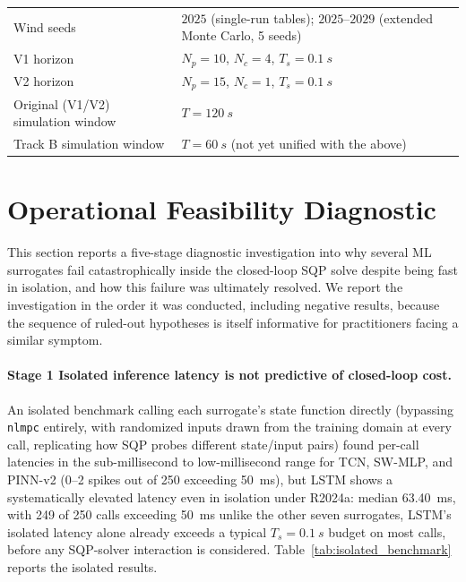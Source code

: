 \begin{table}[H]
\begin{tabularx}{\textwidth}{
			>{\raggedright\arraybackslash}p{4cm}
			>{\raggedright\arraybackslash}X
		}
		Wind seeds
		& $2025$ (single-run tables); $2025$--$2029$ (extended Monte Carlo,
		5 seeds) \\
		
		V1 horizon
		& $N_p=10$, $N_c=4$, $T_s=\SI{0.1}{s}$ \\
		
		V2 horizon
		& $N_p=15$, $N_c=1$, $T_s=\SI{0.1}{s}$ \\
		
		Original (V1/V2) simulation window
		& $T=\SI{120}{s}$ \\
		
		Track B simulation window
		& $T=\SI{60}{s}$ (not yet unified with the above) \\
		
		\bottomrule
	\end{tabularx}
\end{table}

\section{Operational Feasibility Diagnostic}
\label{subsec:operational_feasibility}

This section reports a five-stage diagnostic investigation into why
several ML surrogates fail catastrophically inside the closed-loop SQP
solve despite being fast in isolation, and how this failure was
ultimately resolved. We report the investigation in the order it was
conducted, including negative results, because the sequence of ruled-out
hypotheses is itself informative for practitioners facing a similar
symptom.

\paragraph{Stage 1  Isolated inference latency is not predictive of
closed-loop cost.} An isolated benchmark calling each surrogate's state
function directly (bypassing \texttt{nlmpc} entirely, with randomized
inputs drawn from the training domain at every call, replicating how
SQP probes different state/input pairs) found per-call latencies in the
sub-millisecond to low-millisecond range for TCN, SW-MLP, and PINN-v2
(0--2 spikes out of 250 exceeding \SI{50}{ms}), but LSTM shows a
systematically elevated latency even in isolation under R2024a: median
\SI{63.40}{ms}, with 249 of 250 calls exceeding \SI{50}{ms}  unlike the
other seven surrogates, LSTM's isolated latency alone already exceeds a
typical $T_s=\SI{0.1}{s}$ budget on most calls, before any SQP-solver
interaction is considered. Table~\ref{tab:isolated_benchmark} reports the
isolated results.

